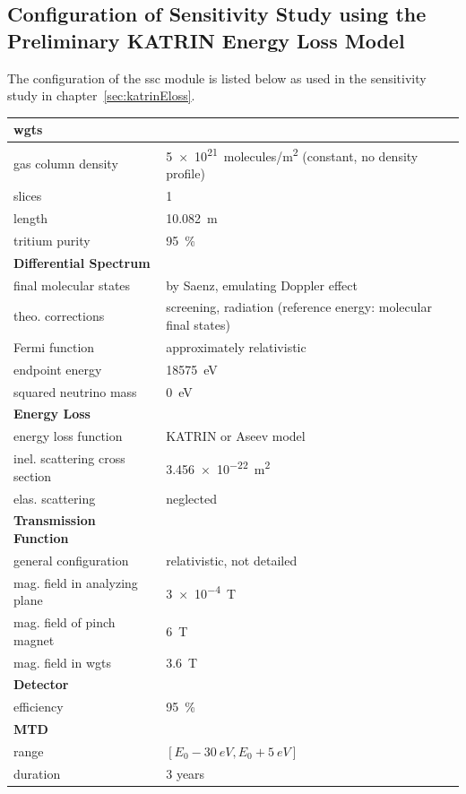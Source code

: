 \begin{samepage}
\section{Configuration of Sensitivity Study using the Preliminary KATRIN Energy Loss Model}
\label{sec:appendixKatrinElossSSCConfig}
The configuration of the \gls{ssc} module is listed below as used in the sensitivity study in chapter~\ref{sec:katrinEloss}.

\newcommand{\myModelConfigTableStrut}{\rule{0pt}{4ex}}
\begin{tabular}{ll}
	\toprule
	\textbf{\gls{wgts}} & \\
	\midrule
	gas column density & \SI{5e21}{molecules/m^2} (constant, no density profile) \\
	slices & 1 \\
	length & \SI{10.082}{m} \\
	tritium purity & \SI{95}{\percent} \\
	\myModelConfigTableStrut
	\textbf{Differential Spectrum} & \\
	\midrule
	final molecular states & by Saenz, emulating Doppler effect \\
	theo. corrections & screening, radiation (reference energy: molecular final states) \\
	Fermi function & approximately relativistic \\
	endpoint energy & \SI{18575}{eV} \\
	squared neutrino mass & \SI{0}{eV} \\
	\myModelConfigTableStrut
	\textbf{Energy Loss} & \\
	\midrule
	energy loss function & KATRIN or Aseev model \\
	inel. scattering cross section & \SI{3.456e-22}{m^2} \\
	elas. scattering & neglected \\
	\myModelConfigTableStrut
	\textbf{Transmission Function} & \\
	\midrule
	general configuration & relativistic, not detailed \\
	mag. field in analyzing plane & \SI{3e-4}{T} \\
	mag. field of pinch magnet & \SI{6}{T} \\
	mag. field in \gls{wgts} & \SI{3.6}{T} \\
	\myModelConfigTableStrut
	\textbf{Detector} & \\
	\midrule
	efficiency & \SI{95}{\percent} \\
	\myModelConfigTableStrut
	\textbf{MTD} & \\
	\midrule
	range & $[E_0-\SI{30}{eV},E_0+\SI{5}{eV}]$ \\
	duration & 3 years \\
	\bottomrule
\end{tabular}
\end{samepage}